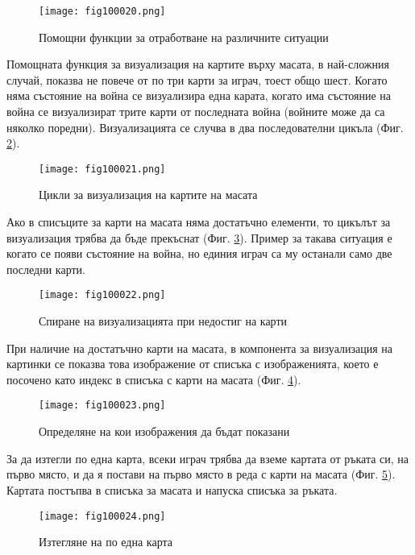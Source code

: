 \begin{figure}[H]
  \centering
  \texttt{[image: fig100020.png]}
  \caption{Помощни функции за отработване на различните ситуации}
\label{fig100020}
\end{figure}

Помощната функция за визуализация на картите върху масата, в най-сложния случай, показва не повече от по три карти за играч, тоест общо шест. Когато няма състояние на война се визуализира една карата, когато има състояние на война се визуализират трите карти от последната война (войните може да са няколко поредни). Визуализацията се случва в два последователни цикъла (Фиг. \ref{fig100021}).

\begin{figure}[H]
  \centering
  \texttt{[image: fig100021.png]}
  \caption{Цикли за визуализация на картите на масата}
\label{fig100021}
\end{figure}

Ако в списъците за карти на масата няма достатъчно елементи, то цикълът за визуализация трябва да бъде прекъснат (Фиг. \ref{fig100022}). Пример за такава ситуация е когато се появи състояние на война, но единия играч са му останали само две последни карти.

\begin{figure}[H]
  \centering
  \texttt{[image: fig100022.png]}
  \caption{Спиране на визуализацията при недостиг на карти}
\label{fig100022}
\end{figure}

При наличие на достатъчно карти на масата, в компонента за визуализация на картинки се показва това изображение от списъка с изображенията, което е посочено като индекс в списъка с карти на масата (Фиг. \ref{fig100023}).

\begin{figure}[H]
  \centering
  \texttt{[image: fig100023.png]}
  \caption{Определяне на кои изображения да бъдат показани}
\label{fig100023}
\end{figure}

За да изтегли по една карта, всеки играч трябва да вземе картата от ръката си, на първо място, и да я постави на първо място в реда с карти на масата (Фиг. \ref{fig100024}). Картата постъпва в списъка за масата и напуска списъка за ръката.

\begin{figure}[H]
  \centering
  \texttt{[image: fig100024.png]}
  \caption{Изтегляне на по една карта}
\label{fig100024}
\end{figure}

